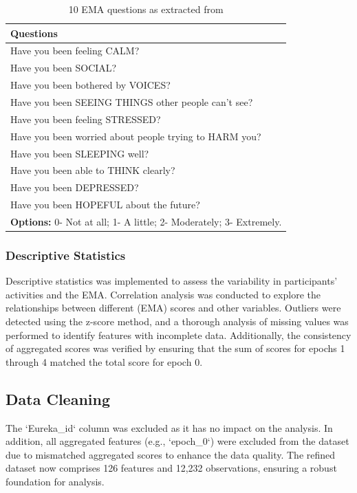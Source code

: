\bigskip
\goodbreak
    
\smallskip
\begin{table}[H]
\centering
\caption{ 10 EMA questions as extracted from \citet{wang2016crosscheck}}
\begin{tabular}{|l|}
\hline
\textbf{Questions} \\ \hline
Have you been feeling CALM? \\ \hline
Have you been SOCIAL? \\ \hline
Have you been bothered by VOICES? \\ \hline
Have you been SEEING THINGS other people can’t see? \\ \hline
Have you been feeling STRESSED? \\ \hline
Have you been worried about people trying to HARM you? \\ \hline
Have you been SLEEPING well? \\ \hline
Have you been able to THINK clearly? \\ \hline
Have you been DEPRESSED? \\ \hline
Have you been HOPEFUL about the future? \\ \hline
\textbf{Options:} 0- Not at all; 1- A little; 2- Moderately; 3- Extremely. \\ \hline
\end{tabular}
\end{table}

\smallskip
 \subsubsection{Descriptive Statistics } 
Descriptive statistics was implemented to assess the variability in participants' activities and the EMA. Correlation analysis was conducted to explore the relationships between different (EMA) scores and other variables. Outliers were detected using the z-score method, and a thorough analysis of missing values was performed to identify features with incomplete data. Additionally, the consistency of aggregated scores was verified by ensuring that the sum of scores for epochs 1 through 4 matched the total score for epoch 0.


\subsection{Data Cleaning} 
The `Eureka\_id` column was excluded as it has no impact on the analysis. In addition, all aggregated features (e.g., `epoch\_0`) were excluded from the dataset due to mismatched aggregated scores to enhance the data quality.  The refined dataset now comprises 126 features and 12,232 observations, ensuring a robust foundation for analysis.
